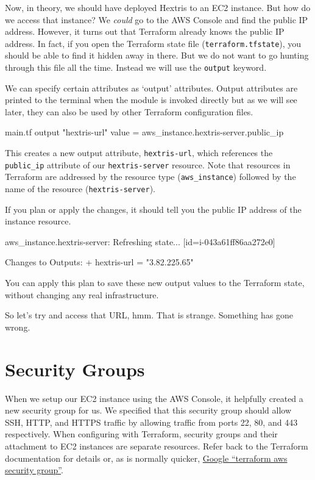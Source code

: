 \documentclass{csse4400}
\begin{document}
Now, in theory, we should have deployed Hextris to an EC2 instance.
But how do we access that instance?
We \textsl{could} go to the AWS Console and find the public IP address.
However, it turns out that Terraform already knows the public IP address.
In fact, if you open the Terraform state file (\texttt{terraform.tfstate}),
you should be able to find it hidden away in there.
But we do not want to go hunting through this file all the time.
Instead we will use the \texttt{output} keyword.

We can specify certain attributes as `output' attributes.
Output attributes are printed to the terminal when the module is invoked directly
but as we will see later, they can also be used by other Terraform configuration files.

\begin{code}[language=terraform,numbers=none]{main.tf}
output "hextris-url" {
  value = aws_instance.hextris-server.public_ip
}
\end{code}

This creates a new output attribute, \texttt{hextris-url},
which references the \texttt{public\_ip} attribute of our \texttt{hextris-server} resource.
Note that resources in Terraform are addressed by the resource type (\texttt{aws\_instance})
followed by the name of the resource (\texttt{hextris-server}).

If you plan or apply the changes, it should tell you the public IP address of the instance resource.

\begin{code}[numbers=none]{}
aws_instance.hextris-server: Refreshing state... [id=i-043a61ff86aa272e0]

Changes to Outputs:
  + hextris-url = "3.82.225.65"
\end{code}

You can apply this plan to save these new output values to the Terraform state, without changing any real infrastructure.  

So let's try and access that URL, hmm.
That is strange. Something has gone wrong.

\section{Security Groups}
When we setup our EC2 instance using the AWS Console,
it helpfully created a new security group for us.
We specified that this security group should allow SSH, HTTP, and HTTPS traffic by allowing traffic from ports 22, 80, and 443 respectively.
When configuring with Terraform, security groups and their attachment to EC2 instances are separate resources.
Refer back to the Terraform documentation for details or,
as is normally quicker, \href{https://www.google.com/search?q=terraform+aws+security+group}{Google ``terraform aws security group''}.
\end{document}
